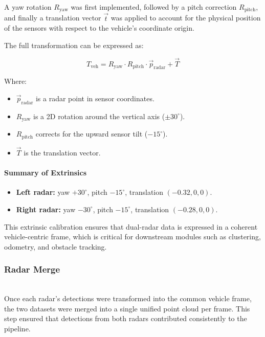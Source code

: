 A yaw rotation \( R_{\text{yaw}} \) was first implemented, followed by a pitch correction \( R_{\text{pitch}} \), and finally a translation vector \( \vec{t} \) was applied to account for the physical position of the sensors with respect to the vehicle's coordinate origin.

The full transformation can be expressed as:

\begin{equation}
T_{\text{veh}} = R_{\text{yaw}} \cdot R_{\text{pitch}} \cdot \vec{p}_{\text{radar}} + \vec{T}
\label{eq:radar_to_vehicle_transform}
\end{equation}

Where:
\begin{itemize}
    \item \( \vec{p}_{\text{radar}} \) is a radar point in sensor coordinates.
    \item \( R_{\text{yaw}} \) is a 2D rotation around the vertical axis ($\pm30^\circ$).
    \item \( R_{\text{pitch}} \) corrects for the upward sensor tilt ($-15^\circ$).
    \item \( \vec{T} \) is the translation vector.
\end{itemize}

\paragraph{Summary of Extrinsics}
\begin{itemize}
    \item \textbf{Left radar:} yaw $+30^\circ$, pitch $-15^\circ$, translation $(-0.32, 0, 0)$.
    \item \textbf{Right radar:} yaw $-30^\circ$, pitch $-15^\circ$, translation $(-0.28, 0, 0)$.
\end{itemize}

This extrinsic calibration ensures that dual-radar data is expressed in a coherent vehicle-centric frame, which is critical for downstream modules such as clustering, odometry, and obstacle tracking.

\vspace{0.5em}
\subsubsection{Radar Merge}  
\hfill 
\\
\indent Once each radar's detections were transformed into the common vehicle frame, the two datasets were merged into a single unified point cloud per frame.  
This step ensured that detections from both radars contributed consistently to the pipeline.  

